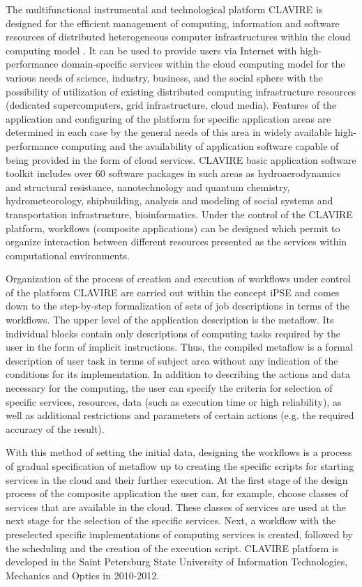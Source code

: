 \documentclass[procedia]{easychair}
\begin{document}
The multifunctional instrumental and technological platform CLAVIRE is designed for the efficient management of computing, information and software resources of distributed heterogeneous computer infrastructures within the cloud computing model \cite{17}. It can be used to provide users via Internet with high-performance domain-specific services within the cloud computing model for the various needs of science, industry, business, and the social sphere with the possibility of utilization of existing distributed computing infrastructure resources (dedicated supercomputers, grid infrastructure, cloud media). Features of the application and configuring of the platform for specific application areas are determined in each case by the general needs of this area in widely available high-performance computing and the availability of application software capable of being provided in the form of cloud services. CLAVIRE basic application software toolkit includes over 60 software packages in such areas as hydroaerodynamics and structural resistance, nanotechnology and quantum chemistry, hydrometeorology, shipbuilding, analysis and modeling of social systems and transportation infrastructure, bioinformatics. Under the control of the CLAVIRE platform, workflows (composite applications) can be designed which permit to organize interaction between different resources presented as the services within computational environments.

Organization of the process of creation and execution of workflows under control of the platform CLAVIRE are carried out within the concept iPSE \cite{21} and comes down to the step-by-step formalization of sets of job descriptions in terms of the workflows. The upper level of the application description is the metaflow. Its individual blocks contain only descriptions of computing tasks required by the user in the form of implicit instructions. Thus, the compiled metaflow is a formal description of user task in terms of subject area without any indication of the conditions for its implementation. In addition to describing the actions and data necessary for the computing, the user can specify the criteria for selection of specific services, resources, data (such as execution time or high reliability), as well as additional restrictions and parameters of certain actions (e.g. the required accuracy of the result).

With this method of setting the initial data, designing the workflows is a process of gradual specification of metaflow up to creating the specific scripts for starting services in the cloud and their further execution. At the first stage of the design process of the composite application the user can, for example, choose classes of services that are available in the cloud. These classes of services are used at the next stage for the selection of the specific services. Next, a workflow with the preselected specific implementations of computing services is created, followed by the scheduling and the creation of the execution script.
CLAVIRE platform is developed in the Saint Petersburg State University of Information Technologies, Mechanics and Optics in 2010-2012.
\end{document}
